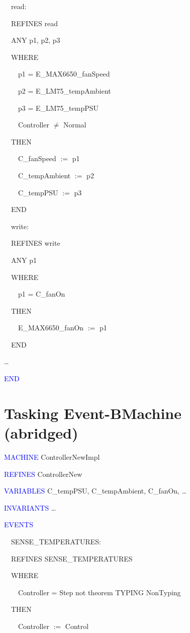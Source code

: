 \documentclass{llncs}%
\begin{document}
\bigskip

\ \ read:\ \  

\ \ REFINES read 

\ \ ANY p1, p2, p3\ \  \ \ 

\ \ WHERE

\ \ \ \ p1 = E\_MAX6650\_fanSpeed \ \ 

\ \ \ \ p2 = E\_LM75\_tempAmbient \ \ 

\ \ \ \ p3 = E\_LM75\_tempPSU \ \ 

\ \ \ \ Controller ${\neq}$ Normal \ \ 

\ \ THEN

\ \ \ \ C\_fanSpeed $:=$ p1 

\ \ \ \ C\_tempAmbient $:=$ p2 \ 

\ \ \ \ C\_tempPSU $:=$ p3 

\ \ END

\bigskip

\ \ write: 

\ \ REFINES write 

\ \ ANY p1\ \  \ 

\ \ WHERE

\ \ \ \ p1 = C\_fanOn \ \ 

\ \ THEN

\ \ \ \ E\_MAX6650\_fanOn $:=$ p1 

\ \ END

\ldots

\textcolor{blue}{END}
%
%
%
\section{Tasking Event-BMachine (abridged)}\label{task}
\textcolor{blue}{MACHINE} ControllerNewImpl \ \ 

\textcolor{blue}{REFINES} ControllerNew \ 

\textcolor{blue}{VARIABLES} C\_tempPSU, C\_tempAmbient, C\_fanOn, {\dots} \ \  \ 

\textcolor{blue}{INVARIANTS} {\dots} 

\bigskip

\textcolor{blue}{EVENTS}

\ \ SENSE\_TEMPERATURES:\ \  \ 

\ \ REFINES SENSE\_TEMPERATURES 

\ \ WHERE

\ \ \ \ Controller = Step not theorem TYPING NonTyping 

\ \ THEN

\ \ \ \ Controller $:=$ Control 
\end{document}
